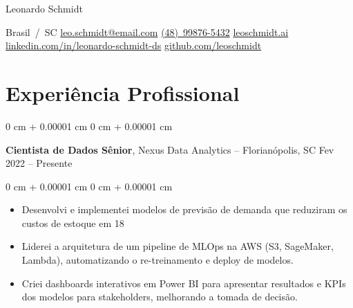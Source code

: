 \documentclass[10pt, letterpaper]{article}
\newenvironment{highlights}{
    \begin{itemize}[
        topsep=0.10 cm,
        parsep=0.10 cm,
        partopsep=0pt,
        itemsep=0pt,
        leftmargin=0 cm + 10pt
    ]
}{
    \end{itemize}
}
\newenvironment{onecolentry}{
    \begin{adjustwidth}{
        0 cm + 0.00001 cm
    }{
        0 cm + 0.00001 cm
    }
}{
    \end{adjustwidth}
}
\newenvironment{header}{
    \setlength{\topsep}{0pt}\par\kern\topsep\centering\linespread{1.5}
}{
    \par\kern\topsep
}
\begin{document}
    \begin{header}
        {\fontsize{25pt}{25pt}\selectfont Leonardo Schmidt}

        \vspace{5pt}

        \normalsize
        \mbox{Brasil / SC} \textbar{} \mbox{\href{mailto:leo.schmidt@email.com}{leo.schmidt@email.com}} \textbar{} \mbox{\href{tel:(48)998765432}{(48) 99876-5432}} \textbar{} \mbox{\href{https://leoschmidt.ai}{leoschmidt.ai}} \textbar{} \mbox{\href{https://linkedin.com/in/leonardo-schmidt-ds}{linkedin.com/in/leonardo-schmidt-ds}} \textbar{} \mbox{\href{https://github.com/leoschmidt}{github.com/leoschmidt}}
    \end{header}

    \vspace{5pt - 0.3cm}
    
\section{Experiência Profissional}

    \begin{onecolentry}
        \setcolumnwidth{\fill, 4.5cm}
        \begin{paracol}{2}
            \textbf{Cientista de Dados Sênior}, Nexus Data Analytics -- Florianópolis, SC
            \switchcolumn
            \raggedleft Fev 2022 – Presente
        \end{paracol}
    \end{onecolentry}
    \vspace{0.10cm}
    \begin{onecolentry}
        \begin{highlights}
                    \item Desenvolvi e implementei modelos de previsão de demanda que reduziram os custos de estoque em 18%
                \item Liderei a arquitetura de um pipeline de MLOps na AWS (S3, SageMaker, Lambda), automatizando o re-treinamento e deploy de modelos.
                \item Criei dashboards interativos em Power BI para apresentar resultados e KPIs dos modelos para stakeholders, melhorando a tomada de decisão.
        \end{highlights}
    \end{onecolentry}
    
\vspace{0.2cm}
\end{document}
